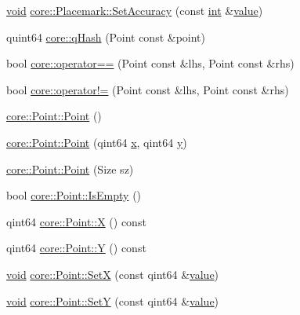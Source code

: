 \begin{DoxyCompactItemize}
\item 
\hyperlink{group___u_a_v_objects_plugin_ga444cf2ff3f0ecbe028adce838d373f5c}{void} \hyperlink{group___o_p_map_widget_gaf3816263edb9fd676defbb9332a69624}{core\-::\-Placemark\-::\-Set\-Accuracy} (const \hyperlink{ioapi_8h_a787fa3cf048117ba7123753c1e74fcd6}{int} \&\hyperlink{glext_8h_aa0e2e9cea7f208d28acda0480144beb0}{value})
\item 
quint64 \hyperlink{group___o_p_map_widget_ga684da93d6a34494be39f2a374429e7e7}{core\-::q\-Hash} (Point const \&point)
\item 
bool \hyperlink{group___o_p_map_widget_ga652c57ec321fe6e8b42404776fb48e49}{core\-::operator==} (Point const \&lhs, Point const \&rhs)
\item 
bool \hyperlink{group___o_p_map_widget_ga9fd3fb077a6e407e4c5a477a8c6d73a0}{core\-::operator!=} (Point const \&lhs, Point const \&rhs)
\item 
\hyperlink{group___o_p_map_widget_ga674c2f3c2d11aa89d2c51dc42bdeb88e}{core\-::\-Point\-::\-Point} ()
\item 
\hyperlink{group___o_p_map_widget_gad1dcff6c9f2c25281ea28be5eb36e2b1}{core\-::\-Point\-::\-Point} (qint64 \hyperlink{glext_8h_a1db9d104e3c2128177f26aff7b46982f}{x}, qint64 \hyperlink{glext_8h_a42315f3ed8fff752bb47fd782309fcfc}{y})
\item 
\hyperlink{group___o_p_map_widget_gad3510c0e0b0ac201ddaced67030e7cdc}{core\-::\-Point\-::\-Point} (Size sz)
\item 
bool \hyperlink{group___o_p_map_widget_ga82d2ada8c2a4cff27b8d1cd67e5b8677}{core\-::\-Point\-::\-Is\-Empty} ()
\item 
qint64 \hyperlink{group___o_p_map_widget_gaa80c6ca1d28f90037f40c53e2093cde2}{core\-::\-Point\-::\-X} () const 
\item 
qint64 \hyperlink{group___o_p_map_widget_ga15325baf78dea74cc34b00887dd5539b}{core\-::\-Point\-::\-Y} () const 
\item 
\hyperlink{group___u_a_v_objects_plugin_ga444cf2ff3f0ecbe028adce838d373f5c}{void} \hyperlink{group___o_p_map_widget_ga3dea470d6276c4049e2aa39b14d637e7}{core\-::\-Point\-::\-Set\-X} (const qint64 \&\hyperlink{glext_8h_aa0e2e9cea7f208d28acda0480144beb0}{value})
\item 
\hyperlink{group___u_a_v_objects_plugin_ga444cf2ff3f0ecbe028adce838d373f5c}{void} \hyperlink{group___o_p_map_widget_gae987195d2da22e1c8e4ca161fe9a2269}{core\-::\-Point\-::\-Set\-Y} (const qint64 \&\hyperlink{glext_8h_aa0e2e9cea7f208d28acda0480144beb0}{value})
\item 

\end{DoxyCompactItemize}
